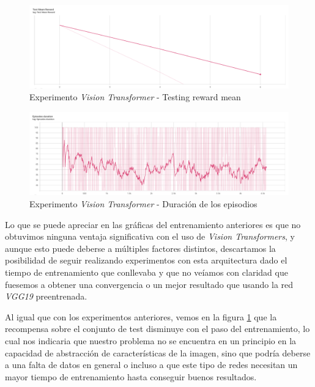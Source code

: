 \begin{figure}[H]
	\centering
	\includegraphics[width=1\textwidth]{figuras/experiments/vision transformers/test_mean_reward.png}
	\caption[Experimento \textit{Vision Transformer} - Testing reward mean]{Experimento \textit{Vision Transformer} - Testing reward mean}
	\label{fig-experimento-vision-transformer-1-testing-reward-mean}
\end{figure}
\begin{figure}[H]
	\centering
	\includegraphics[width=1\textwidth]{figuras/experiments/vision transformers/episodes_duration.png}
	\caption[Experimento \textit{Vision Transformer} - Duración de los episodios]{Experimento \textit{Vision Transformer} - Duración de los episodios}
	\label{fig-experimento-vision-transformer-1-episodes-duration}
\end{figure}

Lo que se puede apreciar en las gráficas del entrenamiento anteriores es que no obtuvimos ninguna ventaja significativa con el uso de \textit{Vision Transformers}, y aunque esto puede deberse a múltiples factores distintos, descartamos la posibilidad de seguir realizando experimentos con esta arquitectura dado el tiempo de entrenamiento que conllevaba y que no veíamos con claridad que fuesemos a obtener una convergencia o un mejor resultado que usando la red \textit{VGG19} preentrenada.
\medskip

Al igual que con los experimentos anteriores, vemos en la figura \ref{fig-experimento-vision-transformer-1-testing-reward-mean} que la recompensa sobre el conjunto de test disminuye con el paso del entrenamiento, lo cual nos indicaria que nuestro problema no se encuentra en un principio en la capacidad de abstracción de características de la imagen, sino que podría deberse a una falta de datos en general o incluso a que este tipo de redes necesitan un mayor tiempo de entrenamiento hasta conseguir buenos resultados.
\medskip

